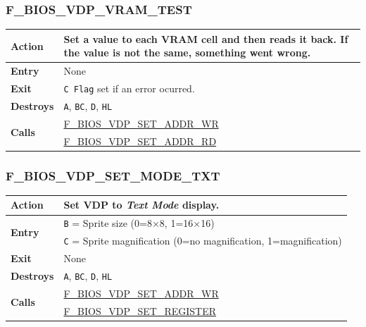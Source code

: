 \documentclass[a4paper,11pt]{article}
\begin{document}
        \subsubsection{F\_BIOS\_VDP\_VRAM\_TEST}
        \label{func:fbiosvdpvramtest}
        \begin{tabular}{l p{9cm}}
            \hline\textbf{Action}
            & Set a value to each \textbf{VRAM} cell and then reads it back. If
            the value is not the same, something went wrong. \\
            \hline\textbf{Entry} & None\\
            \hline\textbf{Exit} & \texttt{C Flag} set if an error ocurred.\\
            \hline\textbf{Destroys} & \texttt{A}, \texttt{BC}, \texttt{D},
            \texttt{HL} \\
            \hline\multirow[t]{2}{4em}{\textbf{Calls}}
            & \hyperref[func:fbiosvdpsetaddrwr]{F\_BIOS\_VDP\_SET\_ADDR\_WR}\\
            & \hyperref[func:fbiosvdpsetaddrrd]{F\_BIOS\_VDP\_SET\_ADDR\_RD}\\
            \hline
        \end{tabular}

        \subsubsection{F\_BIOS\_VDP\_SET\_MODE\_TXT}
        \label{func:fbiosvdpsetmodetxt}
        \begin{tabular}{l p{9cm}}
            \hline\textbf{Action}
            & Set \textbf{VDP} to \textit{Text Mode} display.\\
            \hline\multirow[t]{2}{4em}{\textbf{Entry}}
            & \texttt{B} = Sprite size (0=8×8, 1=16×16)\\
            & \texttt{C} = Sprite magnification (0=no magnification,
                1=magnification)\\
            \hline\textbf{Exit} & None\\
            \hline\textbf{Destroys} & \texttt{A}, \texttt{BC}, \texttt{D},
            \texttt{HL} \\
            \hline\multirow[t]{2}{4em}{\textbf{Calls}}
            & \hyperref[func:fbiosvdpsetaddrwr]{F\_BIOS\_VDP\_SET\_ADDR\_WR}\\
            & \hyperref[func:fbiosvdpsetregister]{F\_BIOS\_VDP\_SET\_REGISTER}\\
            \hline
        \end{tabular}
\end{document}
